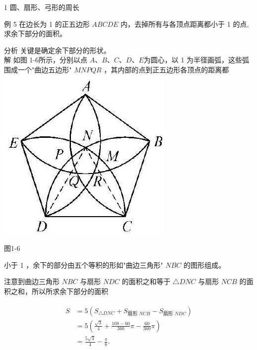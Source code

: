 \documentclass[10pt]{article}
\begin{document}
1 圆、扇形、弓形的周长

例 5 在边长为 1 的正五边形 $A B C D E$ 内，去掉所有与各顶点距离都小于 1 的点, 求余下部分的面积。

分析 关键是确定余下部分的形状。\\
解 如图 1-6所示，分别以点 $A 、 B 、 C 、 D 、 E$为圆心，以 1 为半径画弧，这些弧围成一个"曲边五边形" $M N P Q R$ ，其内部的点到正五边形各顶点的距离都\\
\includegraphics[max width=\textwidth, center]{2024_10_30_66b8e5e701da2093c133g-014}

图1-6

小于 1 ，余下的部分由五个等积的形如"曲边三角形" $N B C$ 的图形组成。

注意到曲边三角形 $N B C$ 与扇形 $N D C$ 的面积之和等于 $\triangle D N C$ 与扇形 $N C B$ 的面积之和，所以所求余下部分的面积

\begin{align*}
\begin{aligned}
S & =5\left(S_{\triangle D N C}+S_{\text {扇形 } N C B}-S_{\text {扇形 } N D C}\right) \\
& =5\left(\frac{\sqrt{3}}{4}+\frac{108-60}{360} \pi-\frac{60}{360} \pi\right) \\
& =\frac{5 \sqrt{3}}{4}-\frac{\pi}{6} .
\end{aligned}
\end{align*}
\end{document}
